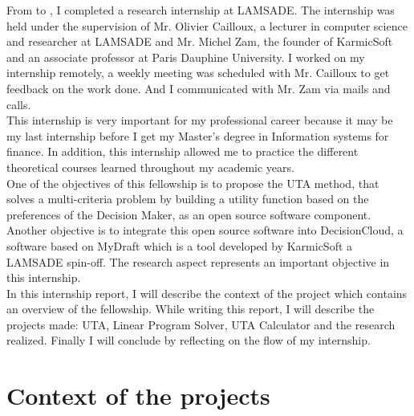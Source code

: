 \documentclass{report}
\begin{document}
From  to , I completed a research internship at LAMSADE. The internship was held under the supervision of Mr. Olivier Cailloux, a lecturer in computer science and researcher at LAMSADE and Mr. Michel Zam, the founder of KarmicSoft and an associate professor at Paris Dauphine University. I worked on my internship remotely, a weekly meeting was scheduled with Mr. Cailloux to get feedback on the work done. And I communicated with Mr. Zam via mails and calls. \\

This internship is very important for my professional career because it may be my last internship before I get my Master’s degree in Information systems for finance.  In addition, this internship allowed me to practice the different theoretical courses learned throughout my academic years.\\

One of the objectives of this fellowship is to propose the UTA method, that solves a multi-criteria problem by building a utility function based on the preferences of the Decision Maker, as an open source software component. Another objective is  to integrate this open source software into DecisionCloud, a software based on MyDraft which is a tool developed by KarmicSoft a LAMSADE spin-off. The research aspect represents an important objective in this internship. \\

In this internship report, I will describe the context of the project which contains an overview of the fellowship. While writing this report, I will describe the projects made: UTA, Linear Program Solver, UTA Calculator and the research realized. Finally I will conclude by reflecting on the flow of my internship. \\

\chapter{Context of the projects}
\end{document}
